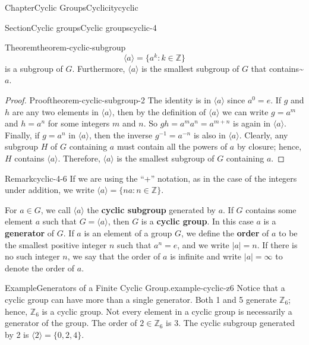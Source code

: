 \documentclass[oneside,10pt,]{book}
\newcommand{\terminology}[1]{\textbf{#1}}
\numberwithin{equation}{section}
\begin{document}
\begin{chapterptx}{Chapter}{Cyclic Groups}{}{Cyclicity}{}{}{cyclic}
\begin{sectionptx}{Section}{Cyclic groups}{}{Cyclic groups}{}{}{cyclic-4}
\begin{theorem}{Theorem}{}{}{theorem-cyclic-subgroup}
\begin{equation*}
\langle a \rangle  = \{ a^k : k \in {\mathbb Z} \}
\end{equation*}
is a subgroup of \(G\).  Furthermore, \(\langle a \rangle\) is the smallest subgroup of \(G\) that contains\textasciitilde{}\(a\).\label{theorem-cyclic-subgroup-1-1-9}%
\end{theorem}
\begin{proof}{Proof}{}{theorem-cyclic-subgroup-2}
The identity is in \(\langle a \rangle \) since \(a^0 = e\). If \(g\) and \(h\) are any two elements in \(\langle a \rangle \), then by the definition of \(\langle a \rangle\) we can write \(g = a^m\) and \(h = a^n\) for some integers \(m\) and \(n\). So \(gh = a^m a^n = a^{m+n}\) is again in \(\langle a \rangle \). Finally, if \(g = a^n\) in \(\langle a \rangle \), then the inverse \(g^{-1} = a^{-n}\) is also in \(\langle a \rangle \). Clearly, any subgroup \(H\) of \(G\) containing \(a\) must contain all the powers of \(a\) by closure; hence, \(H\) contains \(\langle a \rangle \). Therefore, \(\langle a \rangle \) is the smallest subgroup of \(G\) containing \(a\).%
\end{proof}
\begin{remark}{Remark}{}{cyclic-4-6}%
If we are using the ``+'' notation, as in the case of the integers under addition, we write \(\langle a \rangle  = \{ na : n \in {\mathbb Z} \}\).%
\end{remark}
For \(a \in G\), we call \(\langle a \rangle \) the \terminology{cyclic subgroup} generated by \(a\). If \(G\) contains some element \(a\) such that \(G = \langle a \rangle \), then \(G\) is a \terminology{cyclic group}. In this case \(a\) is a \terminology{generator} of \(G\).  If \(a\) is an element of a group \(G\), we define the \terminology{order} of \(a\) to be the smallest positive integer \(n\) such that \(a^n= e\), and we write \(|a| = n\). \label{cyclic-4-7-24} If there is no such integer \(n\), we say that the order of \(a\) is infinite and  write \(|a| = \infty\) to denote the order of \(a\).%
\begin{example}{Example}{Generators of a Finite Cyclic Group.}{example-cyclic-z6}%
Notice that a cyclic group can have more than a single generator. Both 1 and 5 generate \({\mathbb Z}_6\); hence, \({\mathbb Z}_6\) is a cyclic group. Not every element in a cyclic group is necessarily a generator of the group. The order of \(2 \in {\mathbb Z}_6\) is 3. The cyclic subgroup generated by 2 is \(\langle 2 \rangle  = \{ 0, 2, 4 \}\).%

\end{example}
\end{sectionptx}
\end{chapterptx}
\end{document}
